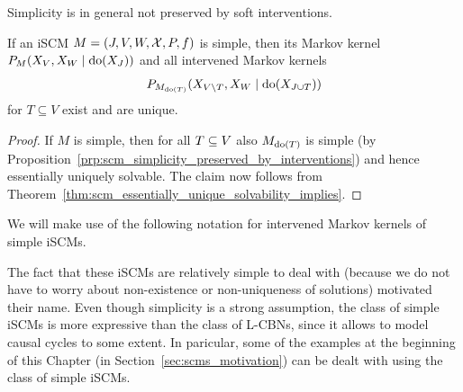 Simplicity is in general not preserved by soft interventions.

\begin{Cor}\label{cor:simple_scm}
  If an iSCM $M = \left ( J, V, W, \mathcal{X}, P, f \right )$ is simple, then its Markov kernel $P_{M}(X_V, X_W \mid \operatorname{do}(X_J))$ and all intervened Markov kernels
  $$P_{M_{\operatorname{do}(T)}}(X_{V \setminus T},X_W \mid \operatorname{do}(X_{J \cup T}))$$
  for $T \subseteq V$ %
  exist and are unique.
\end{Cor}
\begin{proof}
  If $M$ is simple, then for all $T \subseteq V$ also $M_{\operatorname{do}(T)}$ is simple (by Proposition~\ref{prp:scm_simplicity_preserved_by_interventions}) and hence essentially uniquely solvable.
  The claim now follows from Theorem~\ref{thm:scm_essentially_unique_solvability_implies}.
\end{proof}
We will make use of the following notation for intervened Markov kernels of simple iSCMs.

The fact that these iSCMs are relatively simple to deal with (because we do not have to worry about non-existence or non-uniqueness of solutions) motivated their name.
Even though simplicity is a strong assumption, the class of simple iSCMs is more expressive than the class of L-CBNs, since it allows to model causal cycles to some extent.
In paricular, some of the examples at the beginning of this Chapter (in Section~\ref{sec:scms_motivation}) can be dealt with using the class of simple iSCMs.

